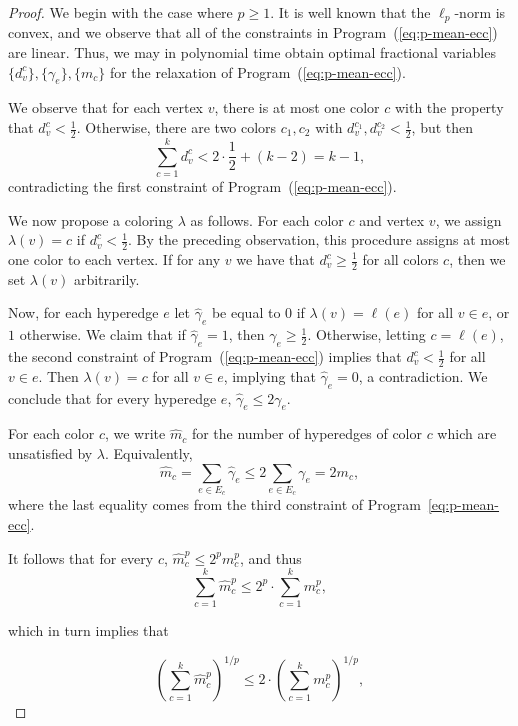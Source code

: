 \begin{proof}

    We begin with the case where $p \geq 1$.
    It is well known that the $\ell_p$-norm is convex, and we observe that all of the constraints
    in Program~(\ref{eq:p-mean-ecc}) are linear. Thus, we may in polynomial time obtain optimal fractional variables $\{d_v^c\}, \{\gamma_e\}, \{m_c\}$
    for the relaxation of Program~(\ref{eq:p-mean-ecc}).

    We observe that for each vertex $v$, there is at most one color $c$ with the property that $d_v^c < \frac{1}{2}$.
    Otherwise, there are two colors $c_1, c_2$ with $d_v^{c_1}, d_v^{c_2} < \frac{1}{2}$, but then
    \[
        \sum_{c=1}^k d_v^c < 2\cdot\frac{1}{2} + (k - 2) = k - 1,
    \]
    contradicting the first constraint of Program~(\ref{eq:p-mean-ecc}).

    We now propose a coloring $\lambda$ as follows. For each color $c$ and vertex $v$, we assign $\lambda(v) = c$ if $d_v^c < \frac{1}{2}$.
    By the preceding observation, this procedure assigns at most one color to each vertex.
    If for any $v$ we have that $d_v^c \geq \frac{1}{2}$ for all colors $c$, then we set $\lambda(v)$ arbitrarily.

    Now, for each hyperedge $e$ let $\hat{\gamma}_e$ be equal to $0$ if $\lambda(v) = \ell(e)$ for all $v \in e$, or $1$ otherwise.
    We claim that if $\hat{\gamma}_e = 1$, then $\gamma_e \geq \frac{1}{2}$.
    Otherwise, letting $c = \ell(e)$, the second constraint of Program~(\ref{eq:p-mean-ecc}) implies that $d_v^c < \frac{1}{2}$ for all $v \in e$.
    Then $\lambda(v) = c$ for all $v \in e$, implying that $\hat{\gamma}_e = 0$, a contradiction.
    We conclude that for every hyperedge $e$, $\hat{\gamma}_e \leq 2\gamma_e$.

    For each color $c$, we write $\hat{m}_c$ for the number of hyperedges of color $c$ which are unsatisfied by $\lambda$.
    Equivalently,
    \[
        \hat{m}_c = \sum_{e \in E_c} \hat{\gamma}_e \leq 2\sum_{e \in E_c} \gamma_e = 2m_c,
    \]
    where the last equality comes from the third constraint of Program~\ref{eq:p-mean-ecc}.

    It follows that for every $c$, $\hat{m}_c^p \leq 2^pm_c^p$, and thus
    \[
        \sum_{c=1}^k \hat{m}_c^p \leq 2^p \cdot \sum_{c=1}^k m_c^p,
    \]

    which in turn implies that

    \[
        \left(\sum_{c=1}^k \hat{m}_c^p\right)^{1/p} \leq 2 \cdot \left(\sum_{c=1}^k m_c^p\right)^{1/p},
    \]


\end{proof}
